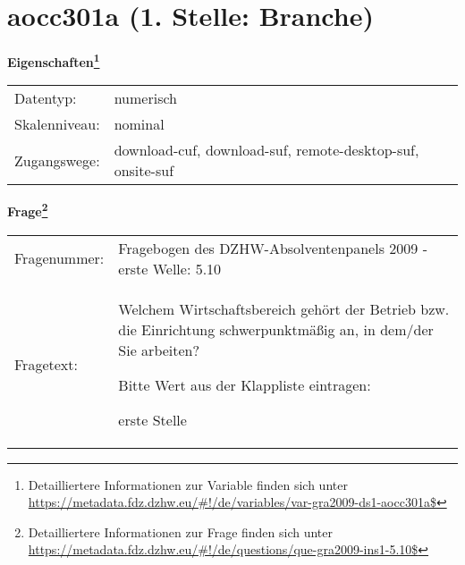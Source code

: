 
    \setcounter{footnote}{0}

    \vspace*{-1.8cm}
	\section{aocc301a (1. Stelle: Branche)}
	\label{section:aocc301a}



    \vspace*{0.5cm}
    \noindent\textbf{Eigenschaften\footnote{Detailliertere Informationen zur Variable finden sich unter
		\url{https://metadata.fdz.dzhw.eu/\#!/de/variables/var-gra2009-ds1-aocc301a$}}}\\
	\begin{tabularx}{\hsize}{@{}lX}
	Datentyp: & numerisch \\
	Skalenniveau: & nominal \\
	Zugangswege: &
	  download-cuf, 
	  download-suf, 
	  remote-desktop-suf, 
	  onsite-suf
 \\
    \end{tabularx}



				\vspace*{0.5cm}
                \noindent\textbf{Frage\footnote{Detailliertere Informationen zur Frage finden sich unter
		              \url{https://metadata.fdz.dzhw.eu/\#!/de/questions/que-gra2009-ins1-5.10$}}}\\
				\begin{tabularx}{\hsize}{@{}lX}
					Fragenummer: &
					  Fragebogen des DZHW-Absolventenpanels 2009 - erste Welle:
					  5.10
 \\
					Fragetext: & Welchem Wirtschaftsbereich gehört der Betrieb bzw. die Einrichtung schwerpunktmäßig an, in dem/der Sie arbeiten?\par  Bitte Wert aus der Klappliste eintragen:\par  erste Stelle \\
				\end{tabularx}





